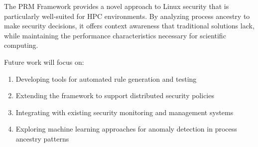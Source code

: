 The PRM Framework provides a novel approach to Linux security that is particularly well-suited for HPC environments. By analyzing process ancestry to make security decisions, it offers context awareness that traditional solutions lack, while maintaining the performance characteristics necessary for scientific computing.

Future work will focus on:

\begin{enumerate}
\item Developing tools for automated rule generation and testing
\item Extending the framework to support distributed security policies
\item Integrating with existing security monitoring and management systems
\item Exploring machine learning approaches for anomaly detection in process ancestry patterns
\end{enumerate}

